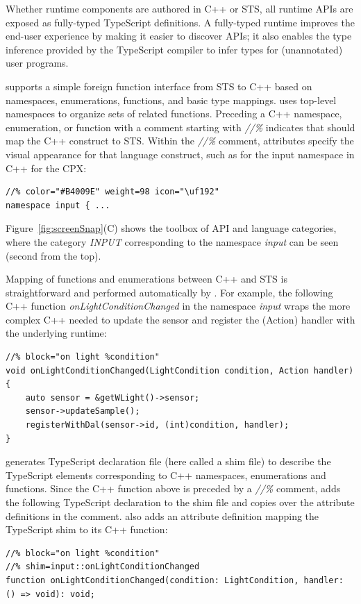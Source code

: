Whether runtime components are authored in C++ or STS, all runtime APIs are exposed as fully-typed TypeScript definitions. A fully-typed runtime improves the end-user experience by making it easier to discover APIs; it also enables the type inference provided by the TypeScript compiler to infer types for (unannotated) user programs.

\MC supports a simple foreign function interface from STS to C++ based on namespaces, enumerations, functions, and basic type mappings. \MC uses top-level namespaces to organize sets of related functions. Preceding a C++ namespace, enumeration, or function
with a comment starting with \emph{//\%} indicates that \MC should map the C++ construct to STS.
Within the \emph{//\%} comment, attributes specify the visual appearance for that
language construct, such as for the input namespace in C++ for the CPX:

\begin{lstlisting}
//% color="#B4009E" weight=98 icon="\uf192"
namespace input { ...
\end{lstlisting}

Figure~\ref{fig:screenSnap}(C) shows the toolbox of API and language categories, where the
category \emph{INPUT} corresponding to the namespace \emph{input} can be seen (second
from the top).

Mapping of functions and enumerations between C++ and STS is straightforward
and performed automatically by \MCN.
For example, the following C++ function \emph{onLightConditionChanged}
in the namespace \emph{input}
wraps the more complex C++ needed to update the sensor and register the (Action)
handler with the underlying \CO runtime:
\begin{lstlisting}
//% block="on light %condition"
void onLightConditionChanged(LightCondition condition, Action handler) {
    auto sensor = &getWLight()->sensor;
    sensor->updateSample();
    registerWithDal(sensor->id, (int)condition, handler);
}
\end{lstlisting}

\MC generates TypeScript declaration file (here called a shim file) to describe the TypeScript
elements corresponding to C++ namespaces, enumerations and functions.
Since the C++ function above is preceded by a \emph{//\%} comment,
\MC adds the following TypeScript declaration to the shim file and copies
over the attribute definitions in the comment. \MC also adds an attribute definition mapping
the TypeScript shim to its C++ function:

\begin{lstlisting}
//% block="on light %condition"
//% shim=input::onLightConditionChanged
function onLightConditionChanged(condition: LightCondition, handler: () => void): void;
\end{lstlisting}

